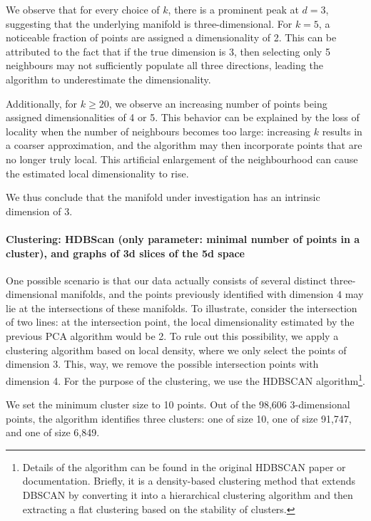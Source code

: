 \documentclass[11pt]{article}
\begin{document}
		We observe that for every choice of $k$, there is a prominent peak at $d = 3$, suggesting that the underlying manifold is three-dimensional. For $k = 5$, a noticeable fraction of points are assigned a dimensionality of 2. This can be attributed to the fact that if the true dimension is 3, then selecting only 5 neighbours may not sufficiently populate all three directions, leading the algorithm to underestimate the dimensionality.
		
		Additionally, for $k \geq 20$, we observe an increasing number of points being assigned dimensionalities of 4 or 5. This behavior can be explained by the loss of locality when the number of neighbours becomes too large: increasing $k$ results in a coarser approximation, and the algorithm may then incorporate points that are no longer truly local. This artificial enlargement of the neighbourhood can cause the estimated local dimensionality to rise.
		
		We thus conclude that the manifold under investigation has an intrinsic dimension of 3.
		
		\paragraph{Clustering: HDBScan (only parameter: minimal number of points in a cluster), and graphs of 3d slices of the 5d space}
		
		One possible scenario is that our data actually consists of several distinct three-dimensional manifolds, and the points previously identified with dimension $4$ may lie at the intersections of these manifolds. To illustrate, consider the intersection of two lines: at the intersection point, the local dimensionality estimated by the previous PCA algorithm would be 2. To rule out this possibility, we apply a clustering algorithm based on local density, where we only select the points of dimension 3. This, way, we remove the possible intersection points with dimension 4. For the purpose of the clustering, we use the HDBSCAN algorithm\footnote{Details of the algorithm can be found in the original HDBSCAN paper or documentation. Briefly, it is a density-based clustering method that extends DBSCAN by converting it into a hierarchical clustering algorithm and then extracting a flat clustering based on the stability of clusters.}.
		
		We set the minimum cluster size to 10 points. Out of the 98,606 3-dimensional points, the algorithm identifies three clusters: one of size 10, one of size 91,747, and one of size 6,849. 
		
\end{document}
